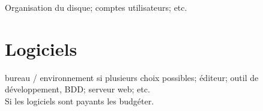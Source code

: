 Organisation du disque; comptes utilisateurs; etc.

\section{Logiciels}

bureau / environnement si plusieurs choix possibles; éditeur; outil de développement, BDD; serveur web; etc.\\

Si les logiciels sont payants les budgéter.
